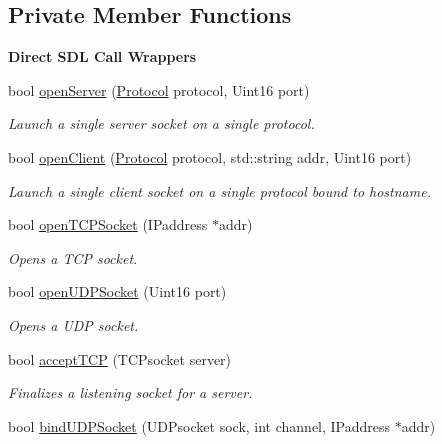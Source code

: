 \subsection*{Private Member Functions}
\begin{Indent}{\bf Direct S\-D\-L Call Wrappers}\par
\begin{DoxyCompactItemize}
\item 
bool \hyperlink{classNetManager_a369f5008d70957c6b3b60d59e453fbee}{open\-Server} (\hyperlink{NetManager_8h_a9af285d1232beed01f31aac5d3a5469f}{Protocol} protocol, Uint16 port)
\begin{DoxyCompactList}\small\item\em Launch a single server socket on a single protocol. \end{DoxyCompactList}\item 
bool \hyperlink{classNetManager_afe3450801d77b53d99b38c8249f3d955}{open\-Client} (\hyperlink{NetManager_8h_a9af285d1232beed01f31aac5d3a5469f}{Protocol} protocol, std\-::string addr, Uint16 port)
\begin{DoxyCompactList}\small\item\em Launch a single client socket on a single protocol bound to hostname. \end{DoxyCompactList}\item 
bool \hyperlink{classNetManager_a90fc6dc31d71fa956486243814352ac5}{open\-T\-C\-P\-Socket} (I\-Paddress $\ast$addr)
\begin{DoxyCompactList}\small\item\em Opens a T\-C\-P socket. \end{DoxyCompactList}\item 
bool \hyperlink{classNetManager_ae49266e3057c0f17cc3c89591cbcf3e1}{open\-U\-D\-P\-Socket} (Uint16 port)
\begin{DoxyCompactList}\small\item\em Opens a U\-D\-P socket. \end{DoxyCompactList}\item 
bool \hyperlink{classNetManager_add2b0af706ca9c983f58c308f0577e5c}{accept\-T\-C\-P} (T\-C\-Psocket server)
\begin{DoxyCompactList}\small\item\em Finalizes a listening socket for a server. \end{DoxyCompactList}\item 
bool \hyperlink{classNetManager_a6c0ceb2fde3906dfe2e8d8527aae7a00}{bind\-U\-D\-P\-Socket} (U\-D\-Psocket sock, int channel, I\-Paddress $\ast$addr)

\end{DoxyCompactItemize}
\end{Indent}
